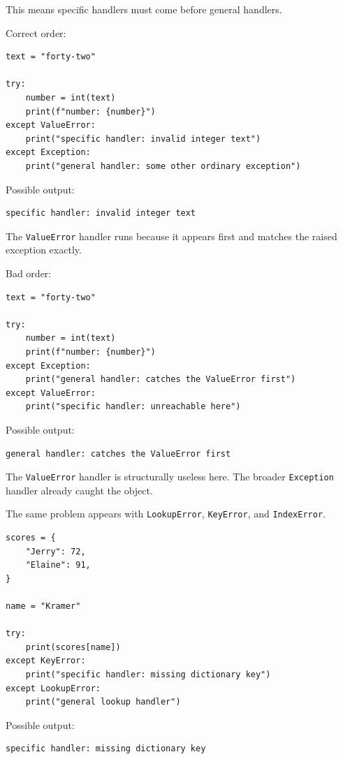 \documentclass[a4paper,twoside]{report}
\begin{document}
This means specific handlers must come before general handlers.

Correct order:

\begin{verbatim}
text = "forty-two"

try:
    number = int(text)
    print(f"number: {number}")
except ValueError:
    print("specific handler: invalid integer text")
except Exception:
    print("general handler: some other ordinary exception")
\end{verbatim}

Possible output:

\begin{verbatim}
specific handler: invalid integer text
\end{verbatim}

The \texttt{ValueError} handler runs because it appears first and matches the raised exception exactly.

Bad order:

\begin{verbatim}
text = "forty-two"

try:
    number = int(text)
    print(f"number: {number}")
except Exception:
    print("general handler: catches the ValueError first")
except ValueError:
    print("specific handler: unreachable here")
\end{verbatim}

Possible output:

\begin{verbatim}
general handler: catches the ValueError first
\end{verbatim}

The \texttt{ValueError} handler is structurally useless here. The broader \texttt{Exception} handler already caught the object.

The same problem appears with \texttt{LookupError}, \texttt{KeyError}, and \texttt{IndexError}.

\begin{verbatim}
scores = {
    "Jerry": 72,
    "Elaine": 91,
}

name = "Kramer"

try:
    print(scores[name])
except KeyError:
    print("specific handler: missing dictionary key")
except LookupError:
    print("general lookup handler")
\end{verbatim}

Possible output:

\begin{verbatim}
specific handler: missing dictionary key
\end{verbatim}
\end{document}
